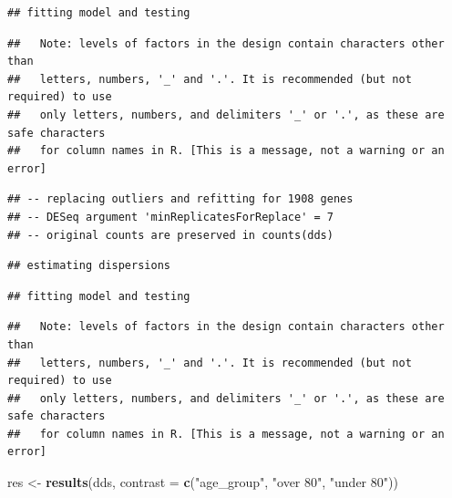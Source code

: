 \documentclass[
]{article}
\newenvironment{Shaded}{\begin{snugshade}}{\end{snugshade}}
\newcommand{\AttributeTok}[1]{\textcolor[rgb]{0.13,0.29,0.53}{#1}}
\newcommand{\FunctionTok}[1]{\textcolor[rgb]{0.13,0.29,0.53}{\textbf{#1}}}
\newcommand{\NormalTok}[1]{#1}
\newcommand{\OtherTok}[1]{\textcolor[rgb]{0.56,0.35,0.01}{#1}}
\newcommand{\StringTok}[1]{\textcolor[rgb]{0.31,0.60,0.02}{#1}}
\begin{document}
\begin{verbatim}
## fitting model and testing
\end{verbatim}

\begin{verbatim}
##   Note: levels of factors in the design contain characters other than
##   letters, numbers, '_' and '.'. It is recommended (but not required) to use
##   only letters, numbers, and delimiters '_' or '.', as these are safe characters
##   for column names in R. [This is a message, not a warning or an error]
\end{verbatim}

\begin{verbatim}
## -- replacing outliers and refitting for 1908 genes
## -- DESeq argument 'minReplicatesForReplace' = 7 
## -- original counts are preserved in counts(dds)
\end{verbatim}

\begin{verbatim}
## estimating dispersions
\end{verbatim}

\begin{verbatim}
## fitting model and testing
\end{verbatim}

\begin{verbatim}
##   Note: levels of factors in the design contain characters other than
##   letters, numbers, '_' and '.'. It is recommended (but not required) to use
##   only letters, numbers, and delimiters '_' or '.', as these are safe characters
##   for column names in R. [This is a message, not a warning or an error]
\end{verbatim}

\begin{Shaded}
\begin{Highlighting}[]
\NormalTok{res }\OtherTok{\textless{}{-}} \FunctionTok{results}\NormalTok{(dds, }\AttributeTok{contrast =} \FunctionTok{c}\NormalTok{(}\StringTok{"age\_group"}\NormalTok{, }\StringTok{"over 80"}\NormalTok{, }\StringTok{"under 80"}\NormalTok{))}
\end{Highlighting}
\end{Shaded}
\end{document}
